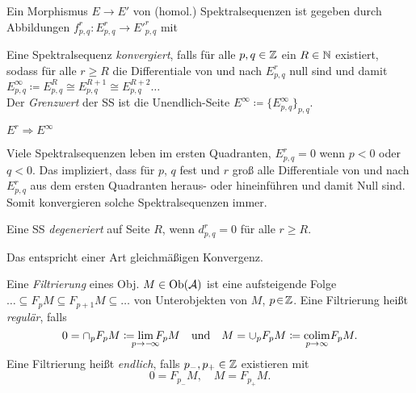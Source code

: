 \documentclass{cheat-sheet}
\begin{document}
\begin{defn}
  Ein Morphismus $E \to E'$ von (homol.) Spektralsequenzen ist gegeben durch Abbildungen $f^r_{p,q} : E^r_{p,q} \to E'^r_{p,q}$ mit
  \begin{itemize}
  \end{itemize}
\end{defn}

\begin{defn}
  Eine Spektralsequenz \emph{konvergiert}, falls für alle $p, q \in \mathbb{Z}$ ein $R \in \mathbb{N}$ existiert, sodass für alle $r \geq R$ die Differentiale von und nach $E^r_{p,q}$ null sind und damit $E^\infty_{p,q} \coloneqq E^R_{p,q} \cong E^{R+1}_{p,q} \cong E^{R+2}_{p,q} \ldots$ \\[2pt]
  Der \emph{Grenzwert} der SS ist die Unendlich-Seite $E^\infty \coloneqq \{ E^\infty_{p,q} \}_{p,q}$.
\end{defn}

\begin{nota}
  $E^r \Rightarrow E^\infty$
\end{nota}

\begin{bem}
  Viele Spektralsequenzen leben im ersten Quadranten, \dh{} $E^r_{p,q} = 0$ wenn $p < 0$ oder $q < 0$. Das impliziert, dass für $p$, $q$ fest und $r$ groß alle Differentiale von und nach $E^r_{p,q}$ aus dem ersten Quadranten heraus- oder hineinführen und damit Null sind. \\
  Somit konvergieren solche Spektralsequenzen immer.
\end{bem}

\begin{defn}
  Eine SS \emph{degeneriert} auf Seite $R$, wenn $d^r_{p,q} \!=\! 0$ für alle $r \!\geq\! R$.
\end{defn}

\begin{bem}
  Das entspricht einer Art gleichmäßigen Konvergenz.
\end{bem}

\begin{defn}
  Eine \emph{Filtrierung} eines Obj. $M \in \operatorname{Ob}(\mathcal{A})$ ist eine aufsteigende Folge $\ldots \subseteq F_p M \subseteq F_{p+1} M \subseteq \ldots$ von Unterobjekten von $M$, $p \!\in\! \mathbb{Z}$.
  Eine Filtrierung heißt \emph{regulär}, falls
  \[
    0 = \cap_p F_p M \coloneqq \lim_{\mathclap{p \to -\!\infty}} F_p M
    \quad \text{und} \quad
    M = \cup_p F_p M \coloneqq \underset{\mathclap{p \to \infty}}{\colim} F_p M.
  \]
  Eine Filtrierung heißt \emph{endlich}, falls $p_{-}, p_{+} \in \mathbb{Z}$ existieren mit
  \[
    0 = F_{p_{-}} M, \quad
    M = F_{p_{+}} M.
  \]
\end{defn}
\end{document}
